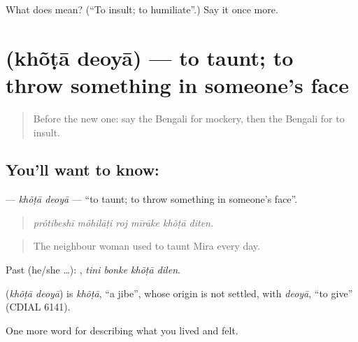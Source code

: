 \begin{tcolorbox}[breakable,colback=teal!4,colframe=teal!35!black,title={Before you move on}]
What does   mean? (\textquotedblleft{}To insult; to humiliate\textquotedblright{}.) Say it once more.
\end{tcolorbox}
\section[\texorpdfstring{\bn{খোঁটা} \bn{দেওয়া} (khõṭā deoyā)}{খোঁটা দেওয়া (khõṭā deoyā)}]{  (khõṭā deoyā) — to taunt; to throw something in someone's face}

\label{lesson:BN-C450-khota-deoya}



\begin{quote}
Before the new one: say the Bengali for mockery, then the Bengali for to insult.
\end{quote}

\subsection*{You'll want to know:  }
\textbf{ } — \emph{khõṭā deoyā} — \textquotedblleft{}to taunt; to throw something in someone's face\textquotedblright{}.

\begin{quote}
     
\end{quote}

\begin{quote}
\emph{prôtibeshī môhilāṭi roj mīrāke khõṭā diten.}
\end{quote}

\begin{quote}
The neighbour woman used to taunt Mira every day.
\end{quote}

Past (he/she …):    , \emph{tini bonke khõṭā dilen}.

\begin{cousinweb}
\textbf{ } (\emph{khõṭā deoyā}) is \emph{khõṭā}, \textquotedblleft{}a jibe\textquotedblright{}, whose origin is not settled, with \emph{deoyā}, \textquotedblleft{}to give\textquotedblright{} (CDIAL 6141).
\end{cousinweb}

\begin{grammarlens}[title={What you've built}]
One more word for describing what you lived and felt.
\end{grammarlens}


